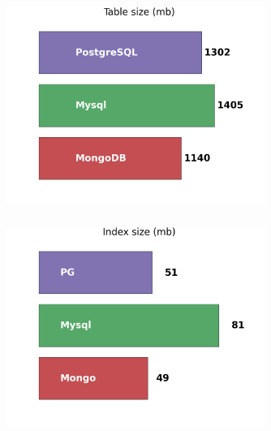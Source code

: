 \documentclass[18pt, compress, aspectratio=169]{beamer}
\begin{document}

\begin{frame}
    \frametitle{}
    \begin{center}
    \begin{figure}
        \includegraphics[width=0.75\textwidth,center]{benchmarks/table_size.png}
    \end{figure}
    \end{center}
\end{frame}

\begin{frame}
    \frametitle{}
    \begin{center}
    \begin{figure}
        \includegraphics[width=0.75\textwidth,center]{benchmarks/index_size.png}
    \end{figure}
    \end{center}
\end{frame}
\end{document}
